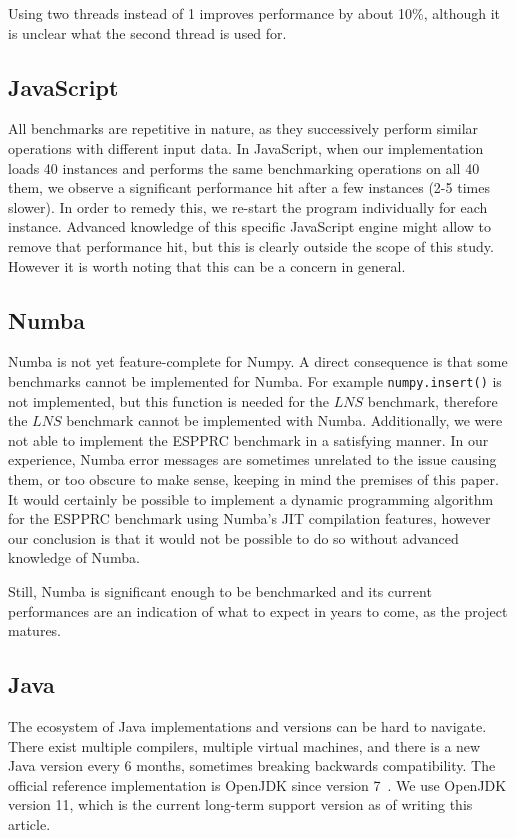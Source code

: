 \documentclass[11pt,a4paper,notitlepage]{article}
\begin{document}
Using two threads instead of 1 improves performance by about 10\%,
although it is unclear what the second thread is used for.


\subsection{JavaScript}
All benchmarks are repetitive in nature, as they successively perform similar
operations with different input data. In JavaScript, when our
implementation loads 40 instances and performs the same
benchmarking operations on all 40 them, we observe a significant performance
hit after a few instances (2-5 times slower). In order to remedy this,
we re-start the program individually for each instance. Advanced
knowledge of this specific JavaScript engine might allow to remove that
performance hit, but this is clearly outside the scope of this
study. However it is worth noting that this can be a concern in general.

\subsection{Numba}
Numba is not yet feature-complete for Numpy. A direct consequence is that some
benchmarks cannot be implemented for Numba. For example
\verb|numpy.insert()| is not implemented, but this function is
needed for the $LNS$ benchmark, therefore the $LNS$ benchmark cannot be
implemented with Numba. Additionally, we were not able to implement
the ESPPRC benchmark in a satisfying manner. In our experience, Numba
error messages are sometimes unrelated to the issue causing them, or
too obscure to make sense, keeping in mind the premises of this
paper. It would certainly be possible to implement a dynamic
programming algorithm for the ESPPRC benchmark using Numba's JIT
compilation features, however our conclusion is that it would not be
possible to do so without advanced knowledge of Numba.

Still, Numba is significant enough to be
benchmarked and its current performances are an indication of what to
expect in years to come, as the project matures.

\subsection{Java}
The ecosystem of Java implementations and versions can be hard to
navigate. There exist multiple compilers, multiple virtual
machines, and there is a new Java version every 6 months, sometimes
breaking backwards compatibility. The official reference
implementation is OpenJDK since version 7~\cite{openjdk-reference}.
We use OpenJDK version 11, which is the current long-term support version as
of writing this article.
\end{document}
